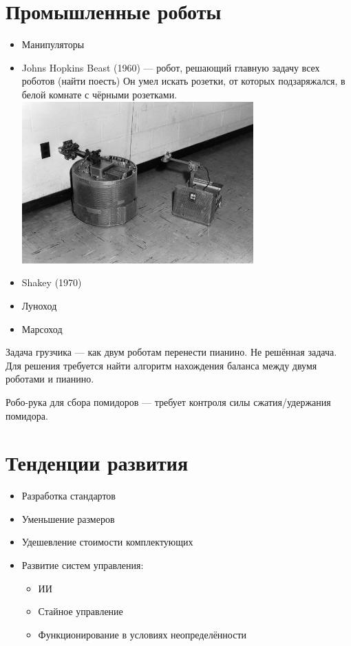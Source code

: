 \documentclass[12pt]{article}
\begin{document}
\begin{sloppypar}
    \section{Промышленные роботы}
    \begin{itemize}
        \item Манипуляторы
        \item Johns Hopkins Beast (1960) — робот, решающий главную задачу всех
              роботов (найти поесть) Он умел искать розетки, от которых
              подзаряжался, в белой комнате с чёрными розетками.
              \includegraphics[width=0.7\textwidth]{graphics/johns_beast.jpg}
        \item Shakey (1970)
        \item Луноход
        \item Марсоход
    \end{itemize}

    Задача грузчика — как двум роботам перенести пианино. Не решённая задача.
    Для решения требуется найти алгоритм нахождения баланса между двумя роботами
    и пианино.

    Робо-рука для сбора помидоров — требует контроля силы сжатия/удержания
    помидора.

    \section{Тенденции развития}
    \begin{itemize}
        \item Разработка стандартов
        \item Уменьшение размеров
        \item Удешевление стоимости комплектующих
        \item Развитие систем управления:
              \begin{itemize}
                  \item ИИ
                  \item Стайное управление
                  \item Функционирование в условиях неопределённости
              \end{itemize}
    \end{itemize}

\end{sloppypar}
\end{document}
